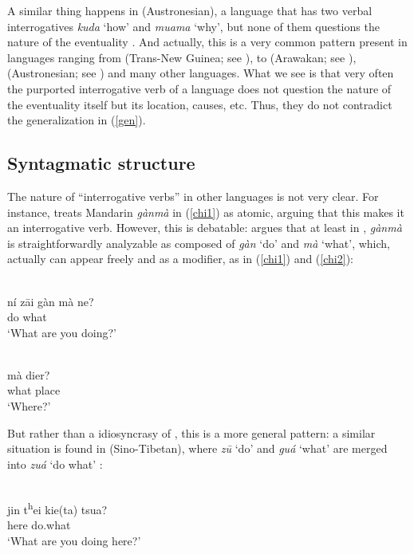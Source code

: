 \documentclass[output=paper]{langsci/langscibook}
\begin{document}
A similar thing happens in  (Austronesian), a language that has two
verbal interrogatives \emph{kuda} `how' and \emph{muama} `why', but none of
them questions the nature of the eventuality \citep{teng2007}. And actually,
this is a very common pattern present in languages ranging from 
(Trans-New Guinea; see \citealt{huber2011}), to  (Arawakan; see
\citealt{guerreiroetal2010}),  (Austronesian; see
\citealt{huang1996}) and many other languages. What we see is that very often
the purported interrogative verb of a language does not question the nature of
the eventuality itself but its location, causes, etc. Thus, they do not
contradict the generalization in (\ref{gen}).

\subsection{Syntagmatic structure}\label{syntagmatic}

The nature of ``interrogative verbs'' in other languages is not very clear. For
instance, \citet[2]{hagege2008} treats Mandarin \emph{gànmà} in (\ref{chi1}) as atomic, arguing that this makes it an interrogative verb. However, this is debatable: \citet[169]{luo2016} argues that at least in , \emph{g\`anm\`a} is straightforwardly analyzable as composed of \emph{g\`an} `do' and \emph{m\`a} `what', which, actually can appear freely and as a modifier, as in (\ref{chi1}) and (\ref{chi2}):
\begin{exe}
\ex \label{chi1} \\
\gll n\'i z\={a}i g\`an m\`a ne?\\
\Ssg{} \Prog{} do what \glossQ{}\\
\glt `What are you doing?'

\ex \label{chi2} \\
\gll m\`a dier?\\
what place\\
\glt `Where?'
\end{exe}

But rather than a idiosyncrasy of , this is a more
general pattern: a similar situation is found in  (Sino-Tibetan),
where \emph{z\={u}} `do' and \emph{gu\'a} `what' are merged into \emph{zu\'a}
`do what' \citep[170]{luo2016}:

\begin{exe}
\ex \label{yg}  \\
\gll jin t\textctc\textsuperscript{h}ei kie(ta\ng) tsua?\\
    \Ssg{} \Prog{} here do.what\\
\glt `What are you doing here?'
\end{exe}
\end{document}
